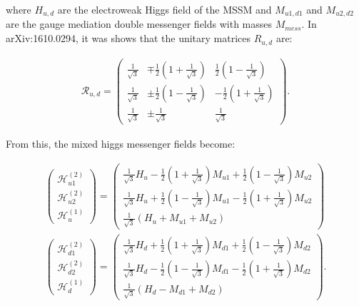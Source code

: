 where $H_{u,d}$ are the electroweak Higgs field of the MSSM and $M_{u1,d1}$ and $M_{u2,d2}$ are the gauge mediation double messenger fields with masses $M_{mess}$. In arXiv:1610.0294, it was shows that the unitary matrices $R_{u,d}$ are:

\begin{eqnarray}
\mathcal{R}_{u,d}= \left ( \begin{array}{ccc} \frac{1}{\sqrt{3}} & \mp \frac{1}{2} \left (1+\frac{1}{\sqrt{3}} \right) & \frac{1}{2} \left (1-\frac{1}{\sqrt{3}} \right) \\  \frac{1}{\sqrt{3}} & \pm \frac{1}{2} \left (1-\frac{1}{\sqrt{3}} \right) & -\frac{1}{2} \left (1+\frac{1}{\sqrt{3}} \right) 
\\  \frac{1}{\sqrt{3}} &  \pm \frac{1}{\sqrt{3}} &  \frac{1}{\sqrt{3}} \end{array} \right ).
\label{rotationmatrices}
\end{eqnarray}

From this, the mixed higgs messenger fields become:

\begin{eqnarray}
 \left (\begin{array}{c} \mathcal{H}^{(2)}_{u1}\\ \mathcal{H}^{(2)}_{u2}\\ \mathcal{H}^{(1)}_u\end{array} \right )= \left (\begin{array}{c} \frac{1}{\sqrt{3}}H_u -\frac{1}{2} \left (1+\frac{1}{\sqrt{3}}\right )M_{u1}+\frac{1}{2}\left (1-\frac{1}{\sqrt{3}}\right )M_{u2} \\
\frac{1}{\sqrt{3}}H_u +\frac{1}{2} \left (1-\frac{1}{\sqrt{3}}\right )M_{u1}-\frac{1}{2}\left (1+\frac{1}{\sqrt{3}}\right )M_{u2}\\
\frac{1}{\sqrt{3}}(H_u+M_{u1}+M_{u2}) \end{array}\right )\nonumber \\
 \left (\begin{array}{c} \mathcal{H}^{(2)}_{d1}\\ \mathcal{H}^{(2)}_{d2}\\ \mathcal{H}^{(1)}_d\end{array} \right )= \left (\begin{array}{c} \frac{1}{\sqrt{3}}H_d +\frac{1}{2} \left (1+\frac{1}{\sqrt{3}}\right )M_{d1}+\frac{1}{2}\left (1-\frac{1}{\sqrt{3}}\right )M_{d2} \\
\frac{1}{\sqrt{3}}H_d -\frac{1}{2} \left (1-\frac{1}{\sqrt{3}}\right )M_{d1}-\frac{1}{2}\left (1+\frac{1}{\sqrt{3}}\right )M_{d2}\\
\frac{1}{\sqrt{3}}(H_d-M_{d1}+M_{d2}) \end{array}\right ).
\label{decomp}
\end{eqnarray}

